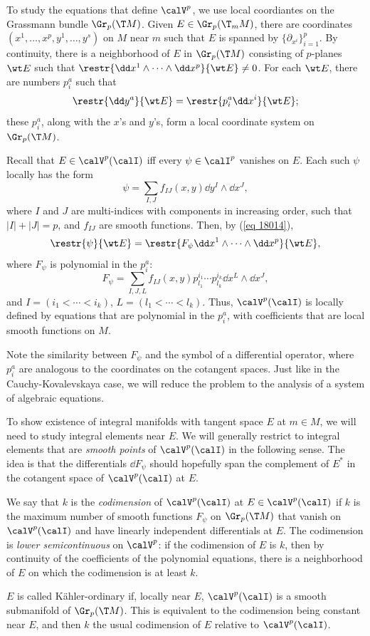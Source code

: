 To study the equations that define $\calV^p$, we use local coordiantes on the Grassmann bundle $\Gr_p(\T M)$. Given $E\in\Gr_p(\T_m M)$, there are coordinates $(x^1,\ldots,x^p,y^1,\ldots,y^s)$ on $M$ near $m$ such that $E$ is spanned by $\{\partial_{x^i}\}_{i=1}^p$. By continuity, there is a neighborhood of $E$ in $\Gr_p(\T M)$ consisting of $p$-planes $\wt E$ such that $\restr{\dd x^1\wedge \cdots\wedge\dd x^p}{\wt E}\neq 0$. For each $\wt E$, there are numbers $p^a_i$ such that 
\[\restr{\dd y^a}{\wt E}=\restr{p^a_i \dd x^i}{\wt E};\label{eq 18014}\] these $p^a_i$, along with the $x$'s and $y$'s, form a local coordinate system on $\Gr_p(\T M)$.

Recall that $E\in\calV^p(\calI)$ iff every $\psi\in\calI^p$ vanishes on $E$. Each such $\psi$ locally has the form 
\[\psi=\sum_{I,J}f_{IJ}(x,y)\dd y^I\wedge \dd x^J,\]
where $I$ and $J$ are multi-indices with components in increasing order, such that $|I|+|J|=p$, and $f_{IJ}$ are smooth functions. Then, by (\ref{eq 18014}), 
\[\restr{\psi}{\wt E}=\restr{F_\psi \dd x^1\wedge\cdots \wedge\dd x^p}{\wt E},\] 
where $F_\psi$ is polynomial in the $p^a_i$:
\[F_\psi=\sum_{I,J,L}f_{IJ}(x,y)p^{i_1}_{l_1}\cdots p^{i_k}_{l_k}\dd x^L\wedge \dd x^J,\]
and $I=(i_1<\cdots<i_k)$, $L=(l_1<\cdots<l_k)$. Thus, $\calV^p(\calI)$ is locally defined by equations that are polynomial in the $p^a_i$, with coefficients that are local smooth functions on $M$. 

Note the similarity between $F_\psi$ and the symbol of a differential operator, where $p^a_i$ are analogous to the coordinates on the cotangent spaces. Just like in the Cauchy-Kovalevskaya case, we will reduce the problem to the analysis of a system of algebraic equations.

To show existence of integral manifolds with tangent space $E$ at $m\in M$, we will need to study integral elements near $E$. We will generally restrict to integral elements that are \emph{smooth points} of $\calV^p(\calI)$ in the following sense. The idea is that the differentials $\dd F_\psi$ should hopefully span the complement of $E^\ast$ in the cotangent space of $\calV^p(\calI)$ at $E$.

\begin{defn}
    We say that $k$ is the \emph{codimension} of $\calV^p(\calI)$ at $E\in \calV^p(\calI)$ if $k$ is the maximum number of smooth functions $F_\psi$ on $\Gr_p(\T M)$ that vanish on $\calV^p(\calI)$ and have linearly independent differentials at $E$. The codimension is \emph{lower semicontinuous} on $\calV^p$: if the codimension of $E$ is $k$, then by continuity of the coefficients of the polynomial equations, there is a neighborhood of $E$ on which the codimension is at least $k$.

    $E$ is called K\"ahler-ordinary if, locally near $E$, $\calV^p(\calI)$ is a smooth submanifold of $\Gr_p(\T M)$. This is equivalent to the codimension being constant near $E$, and then $k$ the usual codimension of $E$ relative to $\calV^p(\calI)$.
\end{defn}

